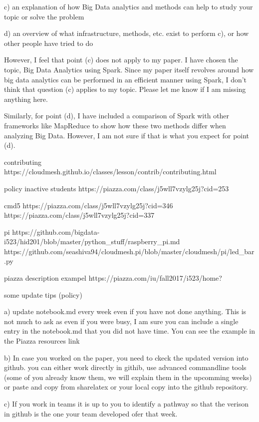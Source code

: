 c) an explanation of how Big Data analytics and methods can help to
study your topic or solve the problem

d) an overview of what infrastructure, methods, etc. exist to perform
c), or how other people have tried to do

 
However, I feel that point (c) does not apply to my paper. I have
chosen the topic, Big Data Analytics using Spark. Since my paper
itself revolves around how big data analytics can be performed in an
efficient manner using Spark, I don't think that question (c) applies
to my topic. Please let me know if I am missing anything here.

Similarly, for point (d), I have included a comparison of Spark with
other frameworks like MapReduce to show how these two methods differ
when analyzing Big Data. However, I am not sure if that is what you
expect for point (d).

 



contributing
https://cloudmesh.github.io/classes/lesson/contrib/contributing.html

policy inactive students
https://piazza.com/class/j5wll7vzylg25j?cid=253

cmd5
https://piazza.com/class/j5wll7vzylg25j?cid=346
https://piazza.com/class/j5wll7vzylg25j?cid=337


pi
https://github.com/bigdata-i523/hid201/blob/master/python_stuff/raspberry_pi.md
https://github.com/seashiva94/cloudmesh.pi/blob/master/cloudmesh/pi/led_bar.py



piazza description exampel
https://piazza.com/iu/fall2017/i523/home?


some update tips (policy)

a) update notebook.md every week even if you have not done
anything. This is not much to ask as even if you were busy, I am sure
you can include a single entry in the notebook.md that you did not
have time. You can see the example in the Piazza resources link

 

b) In case you worked on the paper, you need to ckeck the updated
version into github. you can either work directly in githib, use
advanced commandline tools (some of you already know them, we will
explain them in the upcomming weeks) or paste and copy from sharelatex
or your local copy into the github repository.

 

c) If you work in teams it is up to you to identify a pathway so that
the verison in github is the one your team developed ofer that week.


